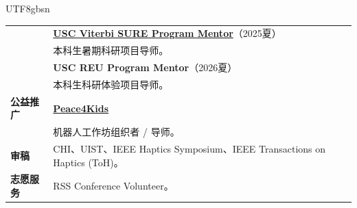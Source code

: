 \documentclass[12pt, letterpaper]{article}
\newlength{\datecolwidth}
\begin{document}
\begin{CJK*}{UTF8}{gbsn}
\begin{tabularx}{\textwidth}{@{}p{\datecolwidth} X@{}}
    & \textbf{\href{https://viterbischool.usc.edu/sure/}{USC Viterbi SURE Program Mentor}}（2025夏） \\
    & 本科生暑期科研项目导师。 \\[4pt]

    & \textbf{USC REU Program Mentor}（2026夏） \\
    & 本科生科研体验项目导师。 \\[6pt]

    \textbf{公益推广} & \textbf{\href{https://www.peace4kids.org/}{Peace4Kids}} \\
    & 机器人工作坊组织者 / 导师。 \\[6pt]

    \textbf{审稿} & CHI、UIST、IEEE Haptics Symposium、IEEE Transactions on Haptics (ToH)。 \\[4pt]

    \textbf{志愿服务} & RSS Conference Volunteer。 \\
\end{tabularx}

\end{CJK*}
\end{document}
